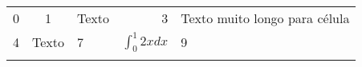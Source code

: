 \begin{table}[h]
	\begin{tabular}{l|c|l||r||p{3cm}}
		0 & 1 & Texto & 3 & Texto muito longo para célula\\
		4 & Texto & 7 & $\int_0^1 2x dx$ & 9 \\ \hline
		&  &  &  &
	\end{tabular}
\end{table}